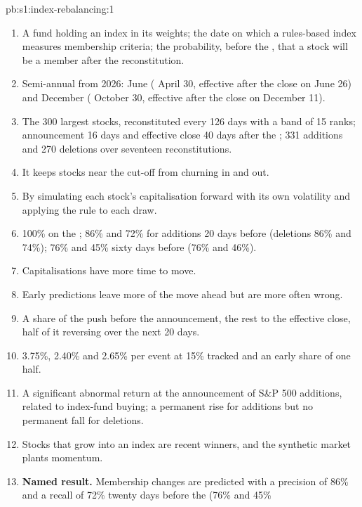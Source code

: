 \begin{solution}{pb:s1:index-rebalancing:1}
\begin{enumerate}
\item A fund holding an index in its weights; the date on which a rules-based index measures membership criteria; the probability, before the , that a
stock will be a member after the reconstitution.
\item Semi-annual from 2026: June ( April 30, effective after the close on June 26) and December ( October 30, effective after the close on
December 11).
\item The 300 largest stocks, reconstituted every 126 days with a band of 15 ranks; announcement 16 days and effective close 40 days after the ;
331 additions and 270 deletions over seventeen reconstitutions.
\item It keeps stocks near the cut-off from churning in and out.
\item By simulating each stock's capitalisation forward with its own volatility and applying the rule to each draw.
\item 100\% on the ; 86\% and 72\% for additions 20 days before (deletions 86\% and 74\%); 76\% and 45\% sixty days before (76\% and 46\%).
\item Capitalisations have more time to move.
\item Early predictions leave more of the move ahead but are more often wrong.
\item A share of the push before the announcement, the rest to the effective close, half of it reversing over the next 20 days.
\item 3.75\%, 2.40\% and 2.65\% per event at 15\% tracked and an early share of one half.
\item A significant abnormal return at the announcement of S\&P 500 additions, related to index-fund buying; a permanent rise for additions but no permanent
fall for deletions.
\item Stocks that grow into an index are recent winners, and the synthetic market plants momentum.
\item \textbf{Named result.} Membership changes are predicted with a precision of 86\% and a recall of 72\% twenty days before the  (76\% and 45\%

\end{enumerate}
\end{solution}
